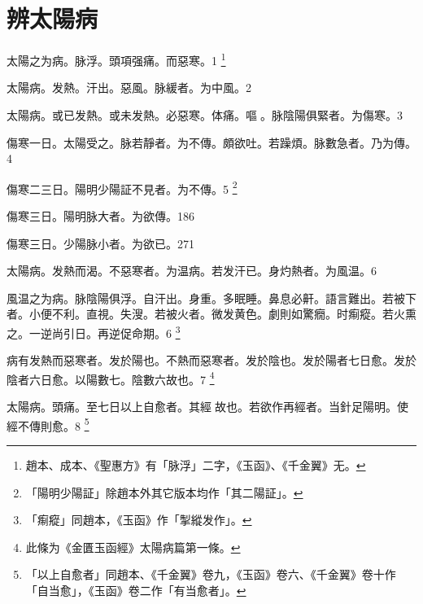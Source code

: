 

\chapter{辨太陽病}

太陽之为病。{\khaai 脉浮。}頭項强痛。而惡寒。1
	\footnote{
		趙本、成本、《聖惠方》有「脉浮」二字，《玉函》、《千金翼》无。
	}

太陽病。发熱。汗出。惡風。脉緩者。为中風。2

%

太陽病。或已发熱。或未发熱。必惡寒。体痛。嘔{\sungii 𠱘}。脉陰陽俱緊者。为傷寒。3


傷寒一日。太陽受之。脉若靜者。为不傳。頗欲吐。若躁煩。脉數急者。乃为傳。4

傷寒{\khaai 二三日}。陽明少陽証不見者。为不傳。5
	\footnote{
		「陽明少陽証」除趙本外其它版本均作「其二陽証」。
	}

傷寒三日。陽明脉大{\khaai 者。为欲傳}。186

傷寒三日。少陽脉小者。为欲已。271


太陽病。发熱而渴。不惡寒者。为温病。若发汗已。身灼熱者。为風温。6

風温{\khaai 之}为病。脉陰陽俱浮。自汗出。身重。多眠睡。鼻息必鼾。語言難出。若被下者。小便不利。直視。失溲。若被火者。微发黄{\khaai 色}。劇則如驚癇。时痸瘲。若火熏之。一逆尚引日。再逆促命期。6
	\footnote{
		「痸瘲」同趙本，《玉函》作「掣縱发作」。
	}

病有发熱而惡寒者。发於陽也。不熱而惡寒者。发於陰也。发於陽者七日愈。发於陰者六日愈。以陽數七。陰數六故也。7
	\footnote{
		此條为《金匱玉函經》太陽病篇第一條。
	}

太陽病。頭痛。至七日以上自愈者。其經{\sungii 𥁞}故也。若欲作再經者。当針足陽明。使經不傳則愈。8
	\footnote{
		「以上自愈者」同趙本、《千金翼》卷九，《玉函》卷六、《千金翼》卷十作「自当愈」，《玉函》卷二作「有当愈者」。
	}

